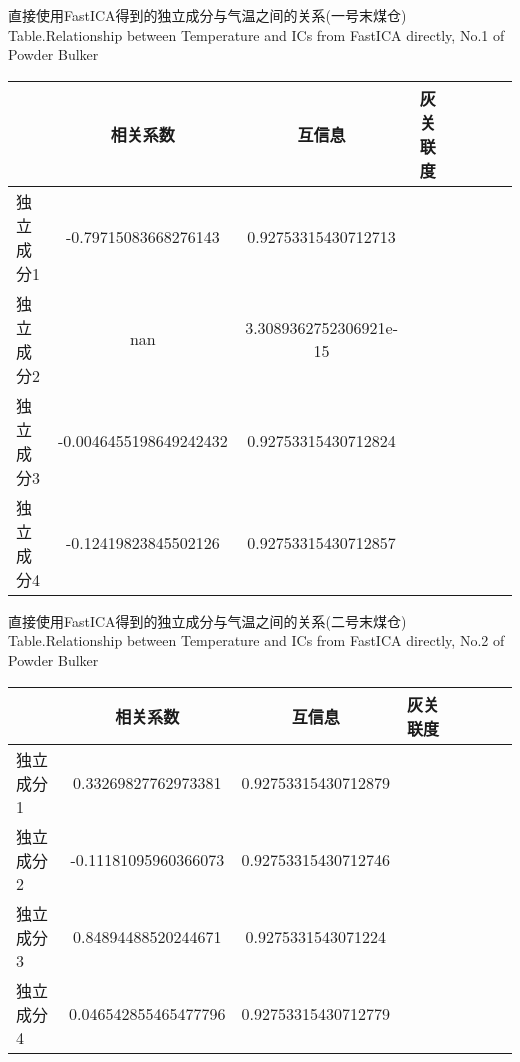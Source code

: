 \begin{table}[!htb]
\begin{center}
		{直接使用FastICA得到的独立成分与气温之间的关系(一号末煤仓)}
			{Table.}{Relationship between Temperature and ICs from FastICA directly, No.1 of Powder Bulker}
\begin{tabular}{lccclccc}
\toprule
                & 相关系数     						& 互信息      						&灰关联度 \\
\midrule
  独立成分1     &  -0.79715083668276143     	& 0.92753315430712713			&    \\
  独立成分2     &  nan							& 3.3089362752306921e-15		&    \\
  独立成分3     &  -0.0046455198649242432		& 0.92753315430712824 			&    \\
  独立成分4     &  -0.12419823845502126		& 0.92753315430712857 			&    \\
 \bottomrule
\end{tabular}
\end{center}
\end{table}

\begin{table}[!htb]
\begin{center}
		{直接使用FastICA得到的独立成分与气温之间的关系(二号末煤仓)}
			{Table.}{Relationship between Temperature and ICs from FastICA directly, No.2 of Powder Bulker}
\begin{tabular}{lccclccc}
\toprule
                & 相关系数     						& 互信息      						&灰关联度 \\
\midrule
  独立成分1     &  0.33269827762973381	     	& 0.92753315430712879			&    \\
  独立成分2     &  -0.11181095960366073		& 0.92753315430712746			&    \\
  独立成分3     &  0.84894488520244671		& 0.9275331543071224 			&    \\
  独立成分4     &  0.046542855465477796		& 0.92753315430712779			&    \\
 \bottomrule
\end{tabular}
\end{center}
\end{table}


